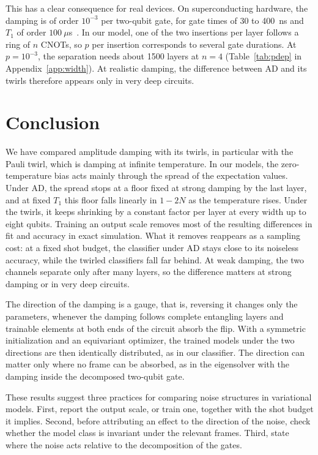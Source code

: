 \documentclass[
 aps,pra,
 twocolumn,
 superscriptaddress,
 longbibliography,
 nofootinbib
]{revtex4-2}
\begin{document}
This has a clear consequence for real devices. On superconducting hardware,
the damping
is of order $10^{-3}$ per two-qubit gate, for gate times of 30 to 400~ns and
$T_1$ of order $100~\mu$s~\cite{krantz2019quantum}. In our model, one of the
two insertions per layer follows a ring of $n$ CNOTs, so $p$ per insertion
corresponds to several gate durations. At $p=10^{-3}$, the separation needs
about 1500 layers at $n=4$ (Table~\ref{tab:pdep} in Appendix~\ref{app:width}). At realistic damping, the
difference between AD and its twirls therefore appears only in very deep
circuits.

\section{Conclusion}
\label{sec:conclusion}

We have compared amplitude damping with its twirls, in particular with the
Pauli twirl, which is damping at infinite temperature. In our models, the
zero-temperature bias acts mainly through the spread of the expectation values.
Under AD, the spread stops at a floor fixed at strong damping by the last layer,
and at fixed $T_1$ this floor falls linearly in $1-2N$ as the temperature
rises. Under the twirls, it keeps shrinking by a constant factor per layer at
every width up to eight qubits. Training an output scale removes most of the
resulting differences in fit and accuracy in exact simulation. What it removes reappears as a sampling cost: at a fixed shot budget, the
classifier under AD stays close to its noiseless accuracy, while the twirled
classifiers fall far behind. At weak damping, the two channels separate only
after many layers, so the difference matters at strong damping or in very deep
circuits.

The direction of the damping is a gauge, that is, reversing it changes only
the parameters, whenever the damping follows complete entangling layers and
trainable elements at both ends of the circuit absorb the flip. With a symmetric initialization and an
equivariant optimizer, the trained models under the two directions are then
identically distributed, as in our classifier. The direction can matter only
where no frame can be absorbed, as in the eigensolver with the damping inside
the decomposed two-qubit gate.

These results suggest three practices for comparing noise structures in
variational models. First, report the output scale, or train one, together
with the shot budget it implies. Second, before attributing an effect to the
direction of the noise, check whether the model class is invariant under the
relevant frames. Third, state where the noise acts relative to the
decomposition of the gates.
\end{document}
